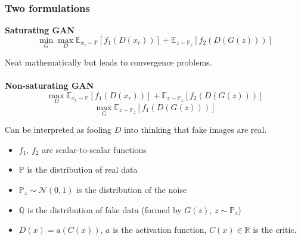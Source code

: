 \documentclass[t]{beamer}
\begin{document}
\begin{frame}
	\frametitle{Two formulations}
	
	\textbf{Saturating GAN}
\begin{equation}
\min_G \max_D \mathbb{E}_{x_r \sim \mathbb{P}}\left[ f_1(D(x_r)) \right] + \mathbb{E}_{z \sim \mathbb{P}_z} \left[ f_2(D(G(z))) \right]
\end{equation}

Neat mathematically but leads to convergence problems. \\~\\

\textbf{Non-saturating GAN}
\begin{equation}
\max_D \mathbb{E}_{x_r \sim \mathbb{P}}\left[ f_1(D(x_r)) \right] + \mathbb{E}_{z \sim \mathbb{P}_z} \left[ f_2(D(G(z))) \right]
\end{equation}
\begin{equation}
\max_G \mathbb{E}_{z \sim \mathbb{P}_z} \left[ f_1(D(G(z))) \right]
\end{equation}

Can be interpreted as fooling $D$ into thinking that fake images are real.

\begin{itemize}
	\item $f_1$, $f_2$ are scalar-to-scalar functions
	\item $\mathbb{P}$ is the distribution of real data
	\item $\mathbb{P}_z \sim \mathcal{N}(0,1)$ is the distribution of the noise
	\item $\mathbb{Q}$ is the distribution of fake data (formed by $G(z)$, $z \sim \mathbb{P}_z$)
	\item $D(x)=\text{a}(C(x))$, $a$ is the activation function, $C(x) \in \mathbb{R}$ is the critic.
\end{itemize}

\end{frame}

\end{document}
